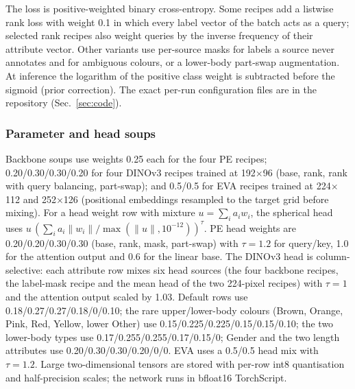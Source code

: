 \documentclass[a4paper, 10pt, conference]{ieeeconf}
\begin{document}
The loss is positive-weighted binary cross-entropy. Some recipes add a listwise rank loss with weight 0.1 in which every label vector of the batch acts as a query; selected rank recipes also weight queries by the inverse frequency of their attribute vector. Other variants use per-source masks for labels a source never annotates and for ambiguous colours, or a lower-body part-swap augmentation. At inference the logarithm of the positive class weight is subtracted before the sigmoid (prior correction). The exact per-run configuration files are in the repository (Sec.~\ref{sec:code}).

\subsubsection{Parameter and head soups}
Backbone soups use weights 0.25 each for the four PE recipes; 0.20/0.30/0.30/0.20 for four DINOv3 recipes trained at 192$\times$96 (base, rank, rank with query balancing, part-swap); and 0.5/0.5 for EVA recipes trained at 224$\times$112 and 252$\times$126 (positional embeddings resampled to the target grid before mixing).
For a head weight row with mixture $u=\sum_i a_i w_i$, the spherical head uses $u\,(\sum_i a_i\|w_i\|/\max(\|u\|,10^{-12}))^\tau$. PE head weights are 0.20/0.20/0.30/0.30 (base, rank, mask, part-swap) with $\tau=1.2$ for query/key, 1.0 for the attention output and 0.6 for the linear base. The DINOv3 head is column-selective: each attribute row mixes six head sources (the four backbone recipes, the label-mask recipe and the mean head of the two 224-pixel recipes) with $\tau=1$ and the attention output scaled by 1.03. Default rows use 0.18/0.27/0.27/0.18/0/0.10; the rare upper/lower-body colours (Brown, Orange, Pink, Red, Yellow, lower Other) use 0.15/0.225/0.225/0.15/0.15/0.10; the two lower-body types use 0.17/0.255/0.255/0.17/0.15/0; Gender and the two length attributes use 0.20/0.30/0.30/0.20/0/0. EVA uses a 0.5/0.5 head mix with $\tau=1.2$.
Large two-dimensional tensors are stored with per-row int8 quantisation and half-precision scales; the network runs in bfloat16 TorchScript.
\end{document}
